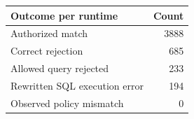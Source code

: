 \begin{tabular}{lr}
\toprule
Outcome per runtime & Count \\
\midrule
Authorized match & 3888 \\
Correct rejection & 685 \\
Allowed query rejected & 233 \\
Rewritten SQL execution error & 194 \\
Observed policy mismatch & 0 \\
\bottomrule
\end{tabular}
